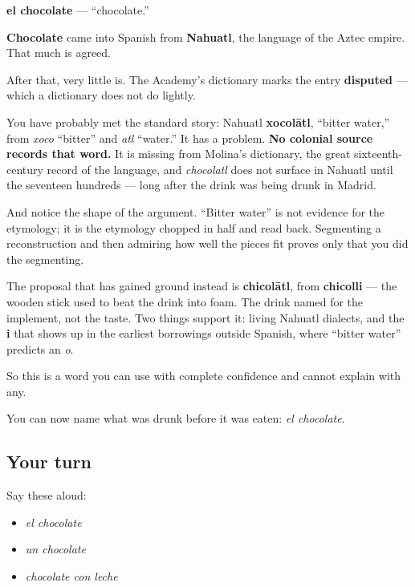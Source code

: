 \begin{cousinweb}
\textbf{el chocolate} — \textquotedblleft{}chocolate.\textquotedblright{}

\textbf{Chocolate} came into Spanish from \textbf{Nahuatl}, the language of the Aztec empire. That much is agreed.

After that, very little is. The Academy's dictionary marks the entry \textbf{disputed} — which a dictionary does not do lightly.

You have probably met the standard story: Nahuatl \textbf{xocolātl}, \textquotedblleft{}bitter water,\textquotedblright{} from \emph{xoco} \textquotedblleft{}bitter\textquotedblright{} and \emph{atl} \textquotedblleft{}water.\textquotedblright{} It has a problem. \textbf{No colonial source records that word.} It is missing from Molina's dictionary, the great sixteenth-century record of the language, and \emph{chocolatl} does not surface in Nahuatl until the seventeen hundreds — long after the drink was being drunk in Madrid.

And notice the shape of the argument. \textquotedblleft{}Bitter water\textquotedblright{} is not evidence for the etymology; it is the etymology chopped in half and read back. Segmenting a reconstruction and then admiring how well the pieces fit proves only that you did the segmenting.

The proposal that has gained ground instead is \textbf{chicolātl}, from \textbf{chicolli} — the wooden stick used to beat the drink into foam. The drink named for the implement, not the taste. Two things support it: living Nahuatl dialects, and the \textbf{i} that shows up in the earliest borrowings outside Spanish, where \textquotedblleft{}bitter water\textquotedblright{} predicts an \emph{o}.

So this is a word you can use with complete confidence and cannot explain with any.
\end{cousinweb}

\begin{grammarlens}[title={What you've built}]
You can now name what was drunk before it was eaten: \emph{el chocolate}.
\end{grammarlens}

\subsection*{Your turn}
Say these aloud:

\begin{itemize}
\raggedright
  \item \emph{el chocolate}
  \item \emph{un chocolate}
  \item \emph{chocolate con leche}
\end{itemize}

